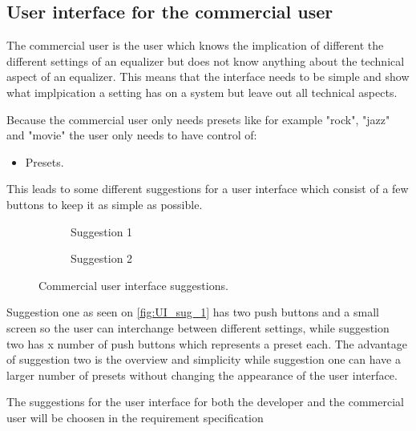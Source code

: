 \subsection{User interface for the commercial user}
The commercial user is the user which knows the implication of different the different settings of an equalizer but does not know anything about the technical aspect of an equalizer. This means that the interface needs to be simple and show what implpication a setting has on a system but leave out all technical aspects. 

Because the commercial user only needs presets like for example "rock", "jazz" and "movie" the user only needs to have control of: 
\begin{itemize}
\item Presets.
\end{itemize} 
This leads to some different suggestions for a user interface which consist of a few buttons to keep it as simple as possible.


\begin{figure}[H]
\centering
\begin{subfigure}[t]{0.47\textwidth}
	\centering
	
	\caption{Suggestion 1}
	\label{fig:UI_sug_1}
\end{subfigure}
\hspace{6mm} 
\begin{subfigure}[t]{0.47\textwidth}
	\centering
	
	\caption{Suggestion 2}
	\label{fig:UI_sug_2}
\end{subfigure}
\caption{Commercial user interface suggestions.}
\label{fig:UI_sug}
\end{figure}

Suggestion one as seen on \autoref{fig:UI_sug_1} has two push buttons and a small screen so the user can interchange between different settings, while suggestion two has x number of push buttons which represents a preset each. The advantage of suggestion two is the overview and simplicity while suggestion one can have a larger number of presets without changing the appearance of the user interface. 

The suggestions for the user interface for both the developer and the commercial user will be choosen in the requirement specification   

